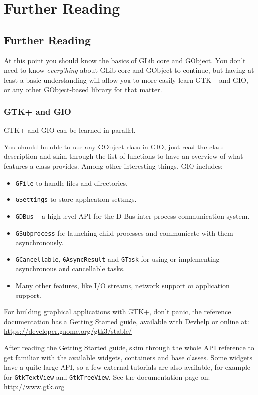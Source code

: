 \part{Further Reading\label{further-reading}}

\chapter{Further Reading}

At this point you should know the basics of GLib core and GObject. You don't need to know \emph{everything} about GLib core and GObject to continue, but having at least a basic understanding will allow you to more easily learn GTK+ and GIO, or any other GObject-based library for that matter.

\section{GTK+ and GIO}
GTK+ and GIO can be learned in parallel.

You should be able to use any GObject class in GIO, just read the class description and skim through the list of functions to have an overview of what features a class provides. Among other interesting things, GIO includes:
\begin{itemize}
  \item \lstinline{GFile} to handle files and directories.
  \item \lstinline{GSettings} to store application settings.
  \item \lstinline{GDBus} -- a high-level API for the D-Bus inter-process communication system.
  \item \lstinline{GSubprocess} for launching child processes and communicate with them asynchronously.
  \item \lstinline{GCancellable}, \lstinline{GAsyncResult} and \lstinline{GTask} for using or implementing asynchronous and cancellable tasks.
  \item Many other features, like I/O streams, network support or application support.
\end{itemize}

For building graphical applications with GTK+, don't panic, the reference documentation has a Getting Started guide, available with Devhelp or online at:\\
\url{https://developer.gnome.org/gtk3/stable/}

After reading the Getting Started guide, skim through the whole API reference to get familiar with the available widgets, containers and base classes. Some widgets have a quite large API, so a few external tutorials are also available, for example for \lstinline{GtkTextView} and \lstinline{GtkTreeView}. See the documentation page on:\\
\url{http://www.gtk.org}

